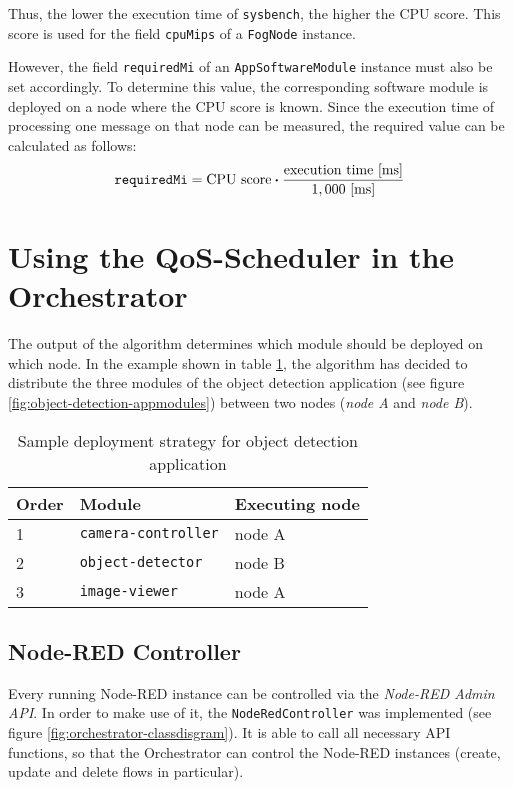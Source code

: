 Thus, the lower the execution time of \texttt{sysbench}, the higher the CPU score. This score is used for the field \texttt{cpuMips} of a \texttt{FogNode} instance.

However, the field \texttt{requiredMi} of an \texttt{AppSoftwareModule} instance must also be set accordingly. To determine this value, the corresponding software module is deployed on a node where the CPU score is known.
Since the execution time of processing one message on that node can be measured, the required value can be calculated as follows:
\[\textrm{\texttt{requiredMi}} = \textrm{CPU score} \boldsymbol{\cdot} \frac{\textrm{execution time [ms]}}{1,000 \textrm{ [ms]}}\]


\section{Using the QoS-Scheduler in the Orchestrator}

The output of the algorithm determines which module should be deployed on which node.
In the example shown in table \ref{tab:deployment-strategy-example}, the algorithm has decided to distribute the three modules of the object detection application (see figure \ref{fig:object-detection-appmodules}) between two nodes (\textit{node A} and \textit{node B}).

\begin{table}[htb]
    \centering
    \begin{tabular}{|m{1.5cm}|m{4cm}|m{3.5cm}|}
        \hline
        \textbf{Order} & \textbf{Module} & \textbf{Executing node}\\
        \hline
        1 & \texttt{camera-controller} & node A\\
        \hline
        2 & \texttt{object-detector} & node B\\
        \hline
        3 & \texttt{image-viewer} & node A\\
        \hline
    \end{tabular}
    \caption{Sample deployment strategy for object detection application}
    \label{tab:deployment-strategy-example}
\end{table}

\subsection*{Node-RED Controller}

Every running Node-RED instance can be controlled via the \textit{Node-RED Admin API}. In order to make use of it, the \texttt{NodeRedController} was implemented (see figure \ref{fig:orchestrator-classdisgram}). It is able to call all necessary API functions, so that the Orchestrator can control the Node-RED instances (create, update and delete flows in particular).

